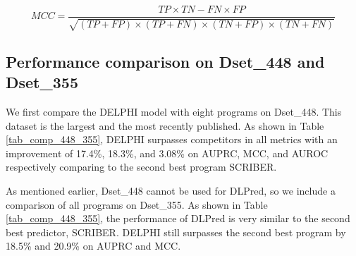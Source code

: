 \begin{equation}
MCC\!=\!\frac{TP \times TN - FN \times FP}{\sqrt{(TP\!+\!FP)\!\times\! (TP\!+\!FN)\! \times \!(TN\!+\!FP)\!\times\!(TN\!+\!FN)}}
\end{equation}
\subsection{Performance comparison on Dset\_448 and Dset\_355}
We first compare the DELPHI model with eight programs on Dset\_448. This dataset is the largest and the most recently published. As shown in Table \ref{tab_comp_448_355}, DELPHI surpasses competitors in all metrics with an improvement of 17.4\%, 18.3\%, and 3.08\% on AUPRC, MCC, and AUROC respectively comparing to the second best program SCRIBER.

As mentioned earlier, Dset\_448 cannot be used for DLPred, so we include a comparison of all programs on Dset\_355. As shown in Table \ref{tab_comp_448_355}, the performance of DLPred is very similar to the second best predictor, SCRIBER.  DELPHI still surpasses the second best program by 18.5\% and 20.9\% on AUPRC and MCC.


